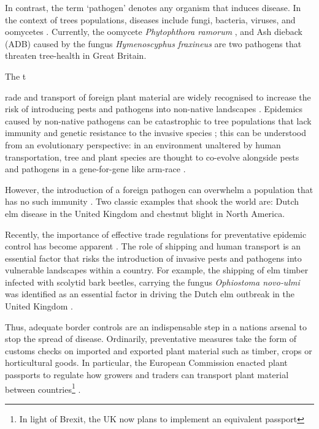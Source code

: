 In contrast, the term `pathogen' denotes any organism that induces disease. 
In the context of trees populations, diseases include fungi, bacteria, viruses, and oomycetes \cite{balloux2017q, Boyd1235773}. 
Currently, the oomycete \textit{Phytophthora ramorum} \cite{brasier2005phytophthora}, and Ash dieback (ADB)
caused by the fungus \textit{Hymenoscyphus fraxineus} \cite{ash-dieback-costs, mitchell2014ash} are two pathogens
that threaten tree-health in Great Britain.


The t\usepackage[]{}rade and transport of foreign plant material are widely recognised to increase the risk
of introducing pests and pathogens into non-native landscapes \cite{POTTER201761, lovett2016nonnative, roy2014increasing}.
Epidemics caused by non-native pathogens can be catastrophic to tree populations that lack immunity and genetic
resistance to the invasive species \cite{doi:10.1002/9781444329988.ch8}; this can be understood from an evolutionary perspective: 
in an environment unaltered by human transportation, tree and plant species are thought to co-evolve alongside pests and pathogens
in a gene-for-gene like arm-race \cite{flor1971current, dangl2001plant, Thrall1735}. 

However, the introduction of a foreign
pathogen can overwhelm a population that has no such immunity \cite{desprez2016evolutionary}. Two classic examples that shook
the world are: Dutch elm disease \cite{doi:10.1111/j.1365-3059.2010.02391.x} in the United Kingdom and chestnut blight
\cite{doi:10.1002/9780470535486.ch7} in North America.

Recently, the importance of effective trade regulations for preventative epidemic control has become apparent
\cite{rodoni2009role}. The role of shipping and human transport is an essential factor that risks the introduction
of invasive pests and pathogens into vulnerable landscapes within a country. For example, the shipping of elm timber
infected with scolytid bark beetles, carrying the fungus \textit{Ophiostoma novo‐ulmi} was identified as an essential
factor in driving the Dutch elm outbreak in the United Kingdom \cite{doi:10.1111/j.1365-3059.2010.02391.x}. 

Thus, adequate border controls are an indispensable step in a nations arsenal to stop the spread of disease.
Ordinarily, preventative measures take the form of customs checks on imported and exported plant material such
as timber, crops or horticultural goods. In particular, the European Commission enacted plant passports to regulate
how growers and traders can transport plant material between countries\footnote{In light of Brexit, the UK now plans
to implement an equivalent passport} \cite{wulfert2010implementation}.

